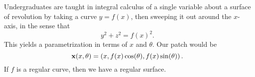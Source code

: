 \begin{example}
Undergraduates are taught in integral calculus of a single variable
about a surface of revolution by taking a curve $y=f(x)$, then sweeping
it out around the $x$-axis, in the sense that
\begin{equation}
y^{2}+z^{2}=f(x)^{2}.
\end{equation}
This yields a parametrization in terms of $x$ and $\theta$. Our patch
would be
\begin{equation}
\mathbf{x}(x,\theta) = \left(x, f(x)\cos(\theta),f(x)\sin(\theta)\right).
\end{equation}
If $f$ is a regular curve, then we have a regular surface.
\end{example}

